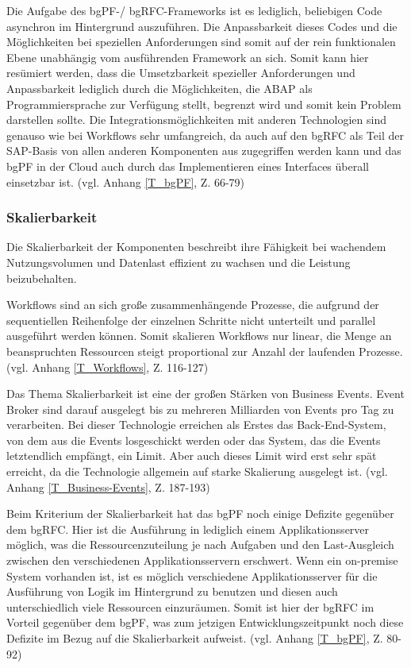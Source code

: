 Die Aufgabe des bgPF-/ bgRFC-Frameworks ist es lediglich, beliebigen Code asynchron im Hintergrund auszuführen. Die Anpassbarkeit dieses Codes und die Möglichkeiten bei speziellen Anforderungen sind somit auf der rein funktionalen Ebene unabhängig vom ausführenden Framework an sich. Somit kann hier resümiert werden, dass die Umsetzbarkeit spezieller Anforderungen und Anpassbarkeit lediglich durch die Möglichkeiten, die ABAP als Programmiersprache zur Verfügung stellt, begrenzt wird und somit kein Problem darstellen sollte. Die Integrationsmöglichkeiten mit anderen Technologien sind genauso wie bei Workflows sehr umfangreich, da auch auf den bgRFC als Teil der SAP-Basis von allen anderen Komponenten aus zugegriffen werden kann und das bgPF in der Cloud auch durch das Implementieren eines Interfaces überall einsetzbar ist. (vgl. Anhang \ref{T_bgPF}, Z. 66-79)

\subsubsection{Skalierbarkeit}

Die Skalierbarkeit der Komponenten beschreibt ihre Fähigkeit bei wachendem Nutzungsvolumen und Datenlast effizient zu wachsen und die Leistung beizubehalten.

Workflows sind an sich gro{\ss}e zusammenhängende Prozesse, die aufgrund der sequentiellen Reihenfolge der einzelnen Schritte nicht unterteilt und \zB parallel ausgeführt werden können. Somit skalieren Workflows nur linear, die Menge an beanspruchten Ressourcen steigt proportional zur Anzahl der laufenden Prozesse. (vgl. Anhang \ref{T_Workflows}, Z. 116-127)

Das Thema Skalierbarkeit ist eine der gro{\ss}en Stärken von Business Events. Event Broker sind darauf ausgelegt bis zu mehreren Milliarden von Events pro Tag zu verarbeiten. Bei dieser Technologie erreichen als Erstes das Back-End-System, von dem aus die Events losgeschickt werden oder das System, das die Events letztendlich empfängt, ein Limit. Aber auch dieses Limit wird erst sehr spät erreicht, da die Technologie allgemein auf starke Skalierung ausgelegt ist. (vgl. Anhang \ref{T_Business-Events}, Z. 187-193)

Beim Kriterium der Skalierbarkeit hat das bgPF noch einige Defizite gegenüber dem bgRFC. Hier ist die Ausführung in lediglich einem Applikationsserver möglich, was die Ressourcenzuteilung je nach Aufgaben und den Last-Ausgleich zwischen den verschiedenen Applikationsservern erschwert. Wenn ein on-premise System vorhanden ist, ist es möglich verschiedene Applikationsserver für die Ausführung von Logik im Hintergrund zu benutzen und diesen auch unterschiedlich viele Ressourcen einzuräumen. Somit ist hier der bgRFC im Vorteil gegenüber dem bgPF, was zum jetzigen Entwicklungszeitpunkt noch diese Defizite im Bezug auf die Skalierbarkeit aufweist. (vgl. Anhang \ref{T_bgPF}, Z. 80-92)

